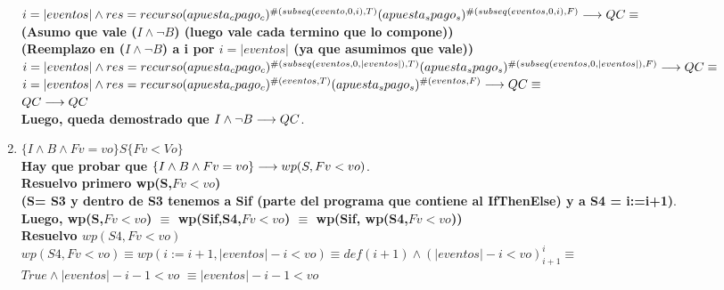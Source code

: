 \documentclass[10pt,a4paper]{article}
\begin{document}
\begin{flushleft}
\begin{enumerate}
	\vspace{2mm}
	$i = |eventos| \wedge res=recurso(apuesta_cpago_c)^{\#(subseq(evento,0,i),T)}(apuesta_spago_s)^{\#(subseq(eventos,0,i),F)}  \longrightarrow QC \equiv $ \\
	\vspace{3mm}
	\textbf{(Asumo que vale ($I \wedge \neg B$) (luego vale cada termino que lo compone))}\\
	\vspace{3mm}
	\textbf{(Reemplazo en ($I \wedge \neg B $) a i por $i= |eventos|$ (ya que asumimos que vale))}\\
	\vspace{3mm}
	$i = |eventos| \wedge res=recurso(apuesta_cpago_c)^{\#(subseq(eventos,0,|eventos|),T)}(apuesta_spago_s)^{\#(subseq(eventos,0,|eventos|),F)} \longrightarrow QC \equiv $ \\
	\vspace{2mm}
	$ i=|eventos| \wedge res=recurso(apuesta_cpago_c)^{\#(eventos,T)}(apuesta_spago_s)^{\#(eventos,F)} \longrightarrow QC \equiv $ \\
	\vspace{2mm}
	$QC \longrightarrow QC$ \\
	\vspace{3mm}
	\textbf{Luego, queda demostrado que $I \wedge \neg B \longrightarrow QC$}. \\
	\item \textbf{$\{ I \wedge B \wedge Fv= vo \}S\{ Fv<Vo \}$}\\
	\vspace{2mm} 
	\textbf{Hay que probar que $\{ I \wedge B \wedge Fv= vo \} \longrightarrow wp(S,Fv<vo)$}.\\
	\vspace{2mm}
	\textbf{Resuelvo primero wp(S,$Fv<vo$)}\\
	\vspace{2mm}
	\textbf{(S= S3 y dentro de S3 tenemos a Sif (parte del programa que contiene al IfThenElse) y a S4 = i:=i+1)}.\\
	\vspace{2mm}
	\textbf{Luego, wp(S,$Fv<vo$) $\equiv$ wp(Sif,S4,$Fv<vo$) $\equiv$ wp(Sif, wp(S4,$Fv<vo$))} \\
	\vspace{6mm}
	\textbf{Resuelvo $wp (S4,Fv<vo)$}\\
	$wp (S4,Fv<vo) \equiv wp (i:= i+1,|eventos|-i <vo) \equiv def (i+1) \land (|eventos|-i<vo)_{i+1}^{i} \equiv$ \\
	\vspace{2mm}
	$True \land |eventos|-i-1<vo$  $\equiv |eventos|-i-1<vo$ \\

\end{enumerate}
\end{flushleft}
\end{document}
